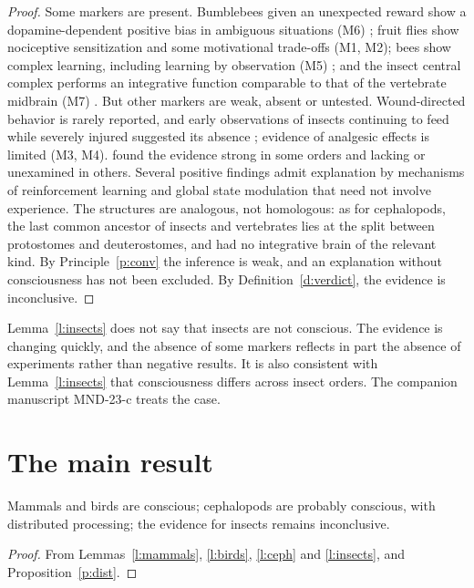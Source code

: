 \documentclass{situationist-preprint}
\begin{document}
\begin{proof}
Some markers are present. Bumblebees given an unexpected reward show a dopamine-dependent positive bias in ambiguous situations (M6) \citep{Solvi2016}; fruit flies show nociceptive sensitization and some motivational trade-offs (M1, M2); bees show complex learning, including learning by observation (M5) \citep{Chittka2022}; and the insect central complex performs an integrative function comparable to that of the vertebrate midbrain (M7) \citep{Barron2016}. But other markers are weak, absent or untested. Wound-directed behavior is rarely reported, and early observations of insects continuing to feed while severely injured suggested its absence \citep{Eisemann1984}; evidence of analgesic effects is limited (M3, M4). \citet{Gibbons2022} found the evidence strong in some orders and lacking or unexamined in others. Several positive findings admit explanation by mechanisms of reinforcement learning and global state modulation that need not involve experience. The structures are analogous, not homologous: as for cephalopods, the last common ancestor of insects and vertebrates lies at the split between protostomes and deuterostomes, and had no integrative brain of the relevant kind. By Principle~\ref{p:conv} the inference is weak, and an explanation without consciousness has not been excluded. By Definition~\ref{d:verdict}, the evidence is inconclusive.
\end{proof}

Lemma~\ref{l:insects} does not say that insects are not conscious. The evidence is changing quickly, and the absence of some markers reflects in part the absence of experiments rather than negative results. It is also consistent with Lemma~\ref{l:insects} that consciousness differs across insect orders. The companion manuscript MND-23-c treats the case.

\section{The main result}

\begin{theorem}\label{t:main}
Mammals and birds are conscious; cephalopods are probably conscious, with distributed processing; the evidence for insects remains inconclusive.
\end{theorem}

\begin{proof}
From Lemmas~\ref{l:mammals}, \ref{l:birds}, \ref{l:ceph} and \ref{l:insects}, and Proposition~\ref{p:dist}.
\end{proof}
\end{document}
